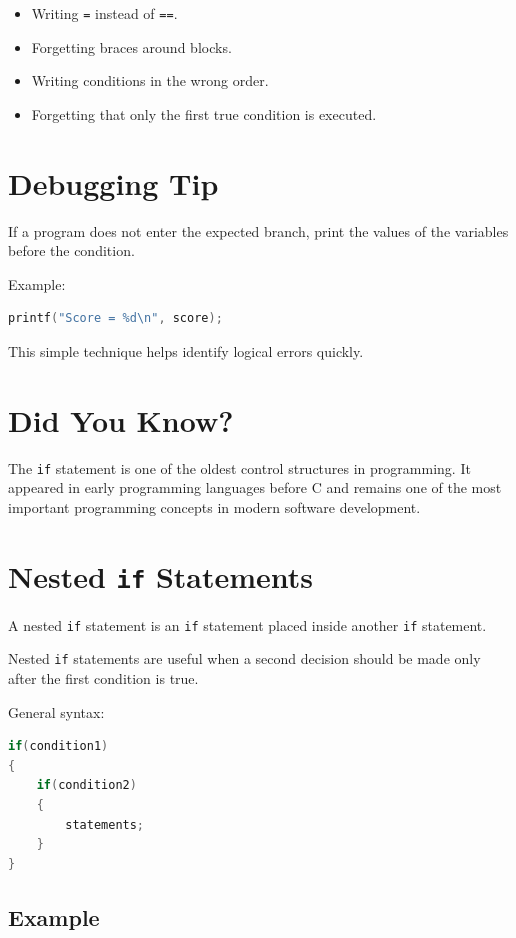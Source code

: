 \documentclass[12pt,openany]{book}
\begin{document}
\begin{itemize}
    \item Writing \texttt{=} instead of \texttt{==}.
    \item Forgetting braces around blocks.
    \item Writing conditions in the wrong order.
    \item Forgetting that only the first true condition is executed.
\end{itemize}

\section{Debugging Tip}

If a program does not enter the expected branch, print the values of the variables before the condition.

Example:

\begin{lstlisting}[language=C]
printf("Score = %d\n", score);
\end{lstlisting}

This simple technique helps identify logical errors quickly.

\section{Did You Know?}

The \texttt{if} statement is one of the oldest control structures in programming. It appeared in early programming languages before C and remains one of the most important programming concepts in modern software development.
\section{Nested \texttt{if} Statements}

A nested \texttt{if} statement is an \texttt{if} statement placed inside another \texttt{if} statement.

Nested \texttt{if} statements are useful when a second decision should be made only after the first condition is true.

General syntax:

\begin{lstlisting}[language=C]
if(condition1)
{
    if(condition2)
    {
        statements;
    }
}
\end{lstlisting}

\subsection{Example}
\end{document}
